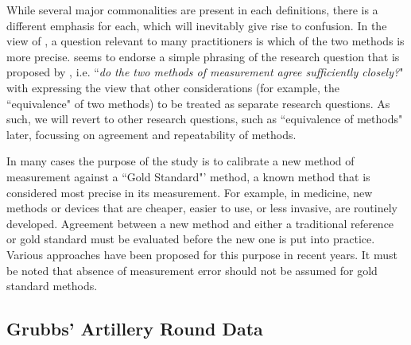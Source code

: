 \documentclass[12pt, a4paper]{report}
\theoremstyle{plain}
\theoremstyle{definition}
\theoremstyle{remark}
\begin{document}
	 
	While several major commonalities are present in each definitions, there is a different emphasis for each, which will inevitably give rise to confusion. In the view of \citet{DunnSEME}, a question relevant to many practitioners is which of the two methods is more precise. \citet{BXC2010} seems to endorse a simple phrasing of the research question that is proposed by \citet{BA83}, i.e. ``\textit{do the two methods of measurement agree sufficiently closely?}" with \citet{BXC2010} expressing the view that other considerations (for example, the ``equivalence" of two methods) to be treated as separate research questions. As such, we will revert to other research questions, such as ``equivalence of methods" later, focussing on agreement and repeatability of methods.
	
	In many cases the purpose of the study is to calibrate a new method of measurement against a ``Gold Standard"’ method, a known method that is considered most precise in its measurement. For example, in medicine, new methods or devices that are cheaper, easier to use, or less invasive, are routinely developed. Agreement between a new method and either a traditional reference or gold standard must be evaluated before the new one is put into practice. Various approaches have been proposed for this purpose in recent years. It must be noted that absence of measurement error should not be assumed for gold standard methods.
	
	
\subsection{Grubbs' Artillery Round Data}	
\end{document}
